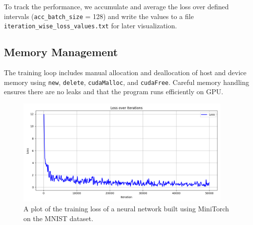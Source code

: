To track the performance, we accumulate and average the loss over defined intervals (\texttt{acc\_batch\_size} = 128) and write the values to a file \texttt{iteration\_wise\_loss\_values.txt} for later visualization.

\subsection{Memory Management}

The training loop includes manual allocation and deallocation of host and device memory using \texttt{new}, \texttt{delete}, \texttt{cudaMalloc}, and \texttt{cudaFree}. Careful memory handling ensures there are no leaks and that the program runs efficiently on GPU.


\begin{figure}[H]
  \begin{center}
    \includegraphics[width=0.95\textwidth]{figures/loss_plot_gpu.png}
  \end{center}
  \caption{A plot of the training loss of a neural network built using MiniTorch on the MNIST dataset.}\label{fig:loss-plot}
\end{figure}


